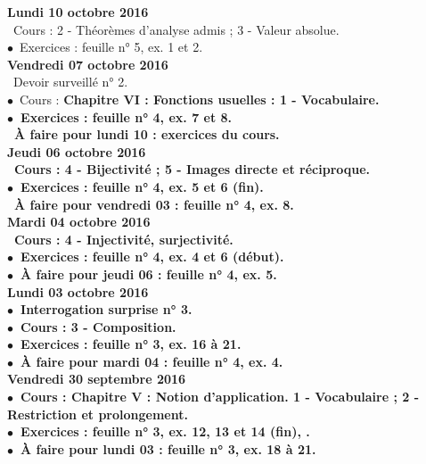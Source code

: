 \documentclass[12pt,a4paper]{article}
\begin{document}
\noindent\textbf{Lundi 10 octobre 2016 }\\
\bu\ Cours :  2 - Théorèmes d'analyse admis ; 3 - Valeur absolue.\\
$\bullet$\ Exercices : feuille n° 5, ex. 1 et 2.\vspace{.4cm}\\
   
\noindent\textbf{Vendredi 07 octobre 2016 }\\
\bu\ Devoir surveillé n° 2.\\
$\bullet$\ Cours : \bf Chapitre VI \rm : Fonctions usuelles : 1 - Vocabulaire.\\
$\bullet$\ Exercices : feuille n° 4, ex. 7 et 8.\\
\bu\ À faire pour lundi 10 : exercices du cours.\vspace{.4cm}\\

\noindent\textbf{Jeudi 06 octobre 2016 }\\
\bu\ Cours : 4 - Bijectivité ; 5 - Images directe et réciproque.\\
$\bullet$\ Exercices : feuille n° 4, ex. 5 et 6 (fin).\\
\bu\ À faire pour vendredi 03 : feuille n° 4, ex. 8.\vspace{.4cm}\\

\noindent\textbf{\bf Mardi 04 octobre 2016 }\\
\bu\ Cours : 4 - Injectivité, surjectivité.\\
$\bullet$\ Exercices : feuille n° 4, ex. 4 et 6 (début).\\
$\bullet$\ À faire pour jeudi 06 : feuille n° 4, ex. 5.\vspace{.4cm}\\

\noindent\textbf{Lundi 03 octobre 2016 }\\
$\bullet$\ Interrogation surprise n° 3.\\
$\bullet$\ Cours : 3 - Composition.\\
$\bullet$\ Exercices : feuille n° 3, ex. 16 à 21.\\
$\bullet$\ À faire pour mardi 04 : feuille n° 4, ex. 4.\vspace{.4cm}\\
  
\noindent\textbf{Vendredi 30 septembre 2016 }\\
$\bullet$\ Cours : \bf Chapitre V \rm : Notion d'application. 1 - Vocabulaire ; 2 - Restriction et prolongement.\\
$\bullet$\ Exercices : feuille n° 3, ex. 12, 13 et 14 (fin), .\\
$\bullet$\ À faire pour lundi 03 : feuille n° 3, ex. 18 à 21.\vspace{.4cm}\\
\end{document}
